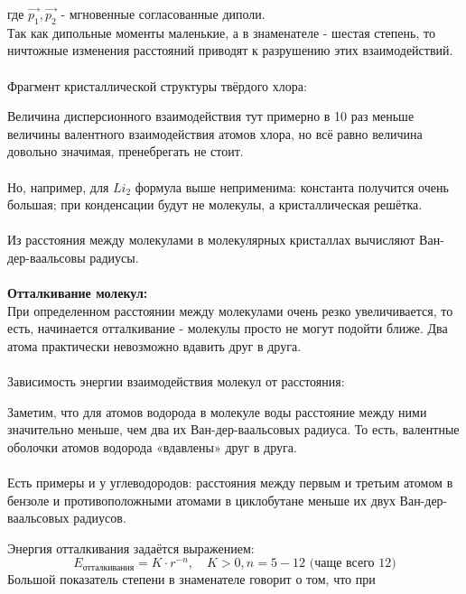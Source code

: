 где $\vec{p_1}, \vec{p_2}$ - мгновенные согласованные диполи. \\
Так как дипольные моменты маленькие, а в знаменателе - шестая
степень, то ничтожные изменения расстояний приводят к
разрушению этих взаимодействий. \\ \\
Фрагмент кристаллической структуры твёрдого хлора:
\begin{figure} [H]
	\centering {\texttt{[image: rr5]}}
\end{figure}
Величина дисперсионного взаимодействия тут примерно в 10 раз
меньше величины валентного взаимодействия атомов хлора, но всё
равно величина довольно значимая, пренебрегать не стоит. \\ \\
Но, например, для $Li_2$ формула выше неприменима: константа
получится очень большая; при конденсации будут не молекулы, а
кристаллическая решётка. \\ \\
Из расстояния между молекулами в молекулярных кристаллах
вычисляют Ван-дер-ваальсовы радиусы. \\ \\
\textbf{Отталкивание молекул:} \\
При определенном расстоянии между молекулами очень резко
увеличивается, то есть, начинается отталкивание - молекулы
просто не могут подойти ближе. Два атома практически
невозможно вдавить друг в друга. \\ \\
Зависимость энергии взаимодействия молекул от расстояния:
\begin{figure} [H]
	\centering {\texttt{[image: rr6]}}
\end{figure}
Заметим, что для атомов водорода в молекуле воды расстояние
между ними значительно меньше, чем два их Ван-дер-ваальсовых
радиуса. То есть, валентные оболочки атомов водорода «вдавлены»
друг в друга. \\ \\
Есть примеры и у углеводородов: расстояния между первым и
третьим атомом в бензоле и противоположными атомами в
циклобутане меньше их двух Ван-дер-ваальсовых радиусов.
\begin{figure} [H]
	\centering {\texttt{[image: rr7]}}
\end{figure}
Энергия отталкивания задаётся выражением:
\[
E_{\text{отталкивания}} = K \cdot r^{-n}, \quad K > 0, n = 5 - 12 \text{ (чаще всего 12)}
\]
Большой показатель степени в знаменателе говорит о том, что при
